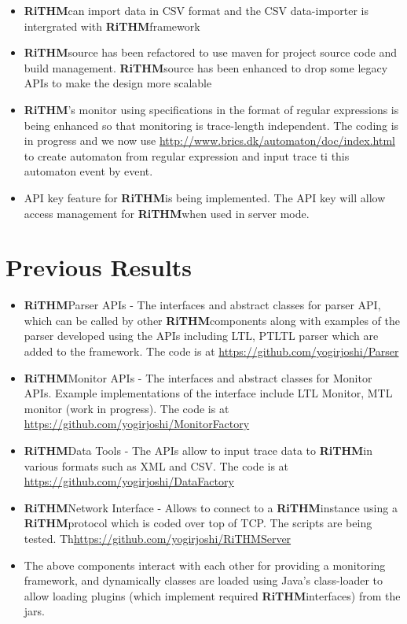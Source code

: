 \documentclass[]{article}
\newcommand{\rithm}{\textbf{RiTHM}\space}
\begin{document}
\begin{itemize}
\item \rithm can import data in CSV format and the CSV data-importer is intergrated with \rithm framework

\item
\rithm source has been refactored to use maven for project source code and build management. \rithm source has been enhanced to drop some legacy APIs to make the design more scalable

\item \rithm's monitor using specifications in the format of regular expressions is being enhanced so that monitoring is trace-length independent. The coding is in progress and we now use \url{http://www.brics.dk/automaton/doc/index.html} to create automaton from regular expression and input trace ti this automaton event by event. 

\item API key feature for \rithm is being implemented. The API key will allow access management for \rithm when used in server mode.
\end{itemize}
\section{Previous Results}
\begin{itemize}
	\item \rithm Parser APIs - The interfaces and abstract classes for parser API, which can be called by other \rithm components along with examples of the parser developed using the APIs  including LTL, PTLTL parser which are added to the framework. The code is at \url{https://github.com/yogirjoshi/Parser}
	\item \rithm Monitor APIs - The interfaces and abstract classes for Monitor APIs. Example implementations of the interface include LTL Monitor, MTL monitor (work in progress). The code is at \url{https://github.com/yogirjoshi/MonitorFactory}	
	\item \rithm Data Tools - The APIs allow to input trace data to \rithm in various formats such as XML and CSV. The code is at \url{https://github.com/yogirjoshi/DataFactory}
	\item \rithm Network Interface - Allows to connect to a \rithm instance using a \rithm protocol which is coded over top of TCP. The scripts are being tested. Th\url{https://github.com/yogirjoshi/RiTHMServer}
	\item The above components interact with each other for providing a monitoring framework, and dynamically classes are loaded using Java's class-loader to allow loading plugins (which implement required \rithm interfaces) from the jars. 

\end{itemize}
\end{document}
